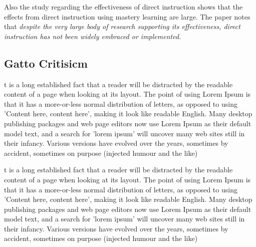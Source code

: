 \documentclass[]{article}
\begin{document}
Also the study regarding the effectiveness of direct instruction \cite{doi:10.3102/0034654317751919} shows that the effects from direct instruction using mastery learning are large. The paper notes that \textit{despite the very large body of research supporting its effectiveness, direct instruction has not been widely embraced or implemented.}
 \subsection[Gatto Critisicm]{Gatto Critisicm}
 t is a long established fact that a reader will be distracted by the readable content of a page when looking at its layout. The point of using Lorem Ipsum is that it has a more-or-less normal distribution of letters, as opposed to using 'Content here, content here', making it look like readable English. Many desktop publishing packages and web page editors now use Lorem Ipsum as their default model text, and a search for 'lorem ipsum' will uncover many web sites still in their infancy. Various versions have evolved over the years, sometimes by accident, sometimes on purpose (injected humour and the like)

t is a long established fact that a reader will be distracted by the readable content of a page when looking at its layout. The point of using Lorem Ipsum is that it has a more-or-less normal distribution of letters, as opposed to using 'Content here, content here', making it look like readable English. Many desktop publishing packages and web page editors now use Lorem Ipsum as their default model text, and a search for 'lorem ipsum' will uncover many web sites still in their infancy. Various versions have evolved over the years, sometimes by accident, sometimes on purpose (injected humour and the like)
\end{document}
